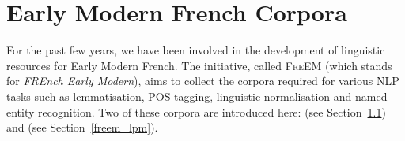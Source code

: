 \section{Early Modern French Corpora}

For the past few years, we have been involved in the development of linguistic resources for Early Modern French. The initiative, called \textsc{FreEM} (which stands for \emph{FREnch Early Modern}), aims to collect the corpora required for various NLP tasks such as lemmatisation, POS tagging, linguistic normalisation and named entity recognition. Two of these corpora are introduced here: \freemmax (see Section~\ref{freem_max}) and \freemlpm (see Section~\ref{freem_lpm}).

\subsection{\texorpdfstring{\freemmax}{FREEM max}}\label{freem_max}

